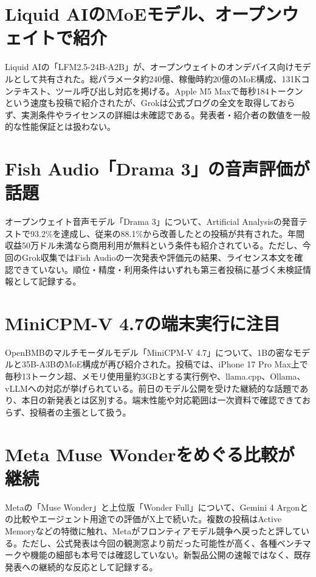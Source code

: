 \section{Liquid AIのMoEモデル、オープンウェイトで紹介}
Liquid AIの「LFM2.5-24B-A2B」が、オープンウェイトのオンデバイス向けモデルとして共有された。総パラメータ約240億、稼働時約20億のMoE構成、131Kコンテキスト、ツール呼び出し対応を掲げる。Apple M5 Maxで毎秒184トークンという速度も投稿で紹介されたが、Grokは公式ブログの全文を取得しておらず、実測条件やライセンスの詳細は未確認である。発表者・紹介者の数値を一般的な性能保証とは扱わない。

\section{Fish Audio「Drama 3」の音声評価が話題}
オープンウェイト音声モデル「Drama 3」について、Artificial Analysisの発音テストで93.2\%を達成し、従来の88.1\%から改善したとの投稿が共有された。年間収益50万ドル未満なら商用利用が無料という条件も紹介されている。ただし、今回のGrok収集ではFish Audioの一次発表や評価元の結果、ライセンス本文を確認できていない。順位・精度・利用条件はいずれも第三者投稿に基づく未検証情報として記録する。

\section{MiniCPM-V 4.7の端末実行に注目}
OpenBMBのマルチモーダルモデル「MiniCPM-V 4.7」について、1Bの密なモデルと35B-A3BのMoE構成が再び紹介された。投稿では、iPhone 17 Pro Max上で毎秒13トークン超、メモリ使用量約3GBとする実行例や、llama.cpp、Ollama、vLLMへの対応が挙げられている。前日のモデル公開を受けた継続的な話題であり、本日の新発表とは区別する。端末性能や対応範囲は一次資料で確認できておらず、投稿者の主張として扱う。

\section{Meta Muse Wonderをめぐる比較が継続}
Metaの「Muse Wonder」と上位版「Wonder Full」について、Gemini 4 Argonとの比較やエージェント用途での評価がX上で続いた。複数の投稿はActive Memoryなどの特徴に触れ、Metaがフロンティアモデル競争へ戻ったと評している。ただし、公式発表は今回の観測窓より前だった可能性が高く、各種ベンチマークや機能の細部も本号では確認していない。新製品公開の速報ではなく、既存発表への継続的な反応として記録する。

